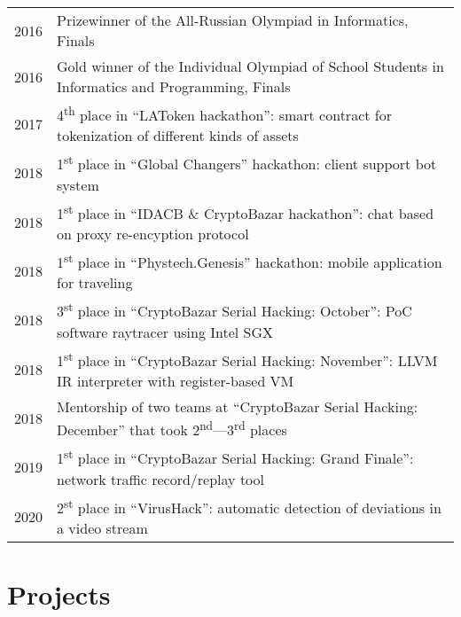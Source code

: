 \documentclass[10pt]{article}
\begin{document}
\begin{tabular}{ l l }
    2016 & Prizewinner of the All-Russian Olympiad in Informatics, Finals \\
    2016 & Gold winner of the Individual Olympiad of School Students in Informatics and Programming, Finals \\
    2017 & 4\textsuperscript{th} place in ``LAToken hackathon'': smart contract for tokenization of different kinds of assets \\
    2018 & 1\textsuperscript{st} place in ``Global Changers'' hackathon: client support bot system \\
    2018 & 1\textsuperscript{st} place in ``IDACB \& CryptoBazar hackathon'': chat based on proxy re-encyption protocol \\
    2018 & 1\textsuperscript{st} place in ``Phystech.Genesis'' hackathon: mobile application for traveling \\
    2018 & 3\textsuperscript{st} place in ``CryptoBazar Serial Hacking: October'': PoC software raytracer using Intel SGX \\
    2018 & 1\textsuperscript{st} place in ``CryptoBazar Serial Hacking: November'': LLVM IR interpreter with register-based VM \\
    2018 & Mentorship of two teams at ``CryptoBazar Serial Hacking: December'' that took 2\textsuperscript{nd}---3\textsuperscript{rd} places \\
    2019 & 1\textsuperscript{st} place in ``CryptoBazar Serial Hacking: Grand Finale'': network traffic record/replay tool \\
    2020 & 2\textsuperscript{st} place in ``VirusHack'': automatic detection of deviations in a video stream \\
\end{tabular}

\medskip

\section{Projects}
\end{document}
